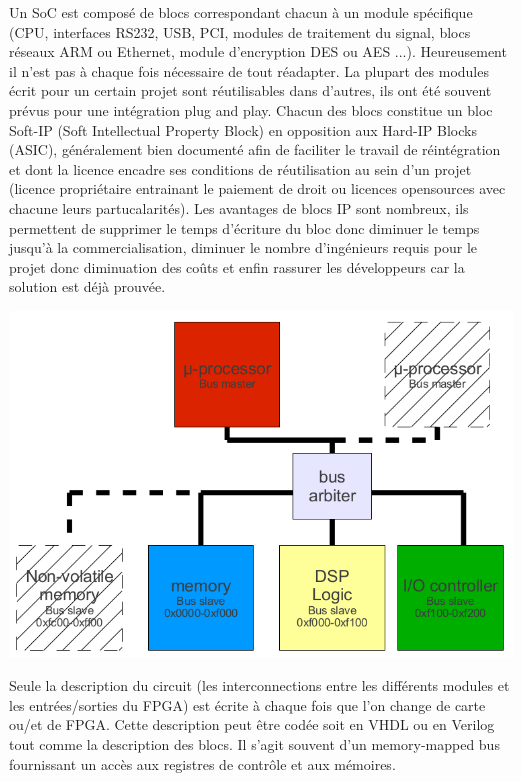 \vspace{15px}

Un SoC est composé de blocs correspondant chacun à un module spécifique (CPU, interfaces RS232, USB, PCI, modules de traitement du signal, blocs réseaux ARM ou Ethernet, module d'encryption DES ou AES ...). Heureusement il n'est pas à chaque fois nécessaire de tout réadapter. La plupart des modules écrit pour un certain projet sont réutilisables dans d'autres, ils ont été souvent prévus pour une intégration plug and play. Chacun des blocs constitue un bloc Soft-IP (Soft Intellectual Property Block) en opposition aux Hard-IP Blocks (ASIC), généralement bien documenté afin de faciliter le travail de réintégration et dont la licence encadre ses conditions de réutilisation au sein d'un projet (licence propriétaire entrainant le paiement de droit ou licences opensources avec chacune leurs partucalarités). Les avantages de blocs IP sont nombreux, ils permettent de supprimer le temps d'écriture du bloc donc diminuer le temps jusqu'à la commercialisation, diminuer le nombre d'ingénieurs requis pour le projet donc diminuation des coûts  et enfin rassurer les développeurs car la solution est déjà prouvée.\\

\begin{center}
\includegraphics[scale=0.4]{soc_arch.png}
\end{center}

Seule la description du circuit (les interconnections entre les différents modules et les entrées/sorties du FPGA) est écrite à chaque fois que l'on change de carte ou/et de FPGA. Cette description peut être codée soit en VHDL ou en Verilog tout comme la description des blocs. Il s'agit souvent d'un memory-mapped bus fournissant un accès aux registres de contrôle et aux mémoires.\\

